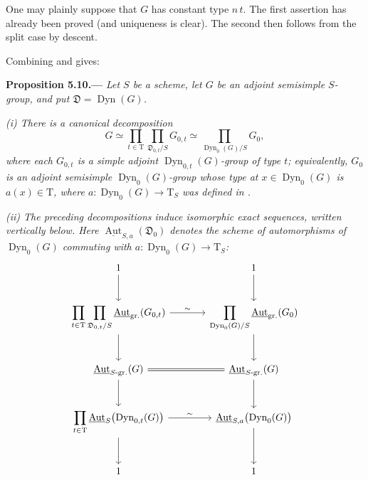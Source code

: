 One may plainly suppose that \(G\) has constant type \(n\,t\).  The
first assertion has already been proved (and uniqueness is clear).
The second then follows from the split case by descent.

Combining  and  gives:

\par\medskip\noindent{}\textbf{Proposition 5.10.---}\enspace
\emph{Let \(S\) be a scheme, let \(G\) be an adjoint semisimple
\(S\)-group, and put \(\mathfrak D=\operatorname{Dyn}(G)\).}

\emph{(i) There is a canonical decomposition}
\[
  G\simeq
  \prod_{t\in\mathrm T}
  \prod_{\mathfrak D_{0,t}/S}G_{0,t}
  \simeq
  \prod_{\operatorname{Dyn}_0(G)/S}G_0,
\]
\emph{where each \(G_{0,t}\) is a simple adjoint
\(\operatorname{Dyn}_{0,t}(G)\)-group of type \(t\); equivalently,
\(G_0\) is an adjoint semisimple
\(\operatorname{Dyn}_0(G)\)-group whose type at
\(x\in\operatorname{Dyn}_0(G)\) is \(a(x)\in\mathrm T\), where
\(a:\operatorname{Dyn}_0(G)\to\mathrm T_S\) was defined in .}

\emph{(ii) The preceding decompositions induce isomorphic exact
sequences, written vertically below.  Here
\(\underline{\operatorname{Aut}}_{S,a}(\mathfrak D_0)\) denotes the
scheme of automorphisms of \(\operatorname{Dyn}_0(G)\) commuting with
\(a:\operatorname{Dyn}_0(G)\to\mathrm T_S\):}
\[
\begin{tikzcd}[column sep=large,row sep=large]
1 \arrow[d] & 1 \arrow[d] \\
\displaystyle
\prod_{t\in\mathrm T}\prod_{\mathfrak D_{0,t}/S}
  \underline{\operatorname{Aut}}_{\mathrm{gr.}}(G_{0,t})
  \arrow[r,"\sim"] \arrow[d]
&
\displaystyle
\prod_{\operatorname{Dyn}_0(G)/S}
  \underline{\operatorname{Aut}}_{\mathrm{gr.}}(G_0)
  \arrow[d]
\\
\underline{\operatorname{Aut}}_{S\text{-}\mathrm{gr.}}(G)
  \arrow[r,equal] \arrow[d]
&
\underline{\operatorname{Aut}}_{S\text{-}\mathrm{gr.}}(G)
  \arrow[d]
\\
\displaystyle\prod_{t\in\mathrm T}
  \underline{\operatorname{Aut}}_S
    \bigl(\operatorname{Dyn}_{0,t}(G)\bigr)
  \arrow[r,"\sim"] \arrow[d]
&
\underline{\operatorname{Aut}}_{S,a}
  \bigl(\operatorname{Dyn}_0(G)\bigr)
  \arrow[d]
\\
1 & 1
\end{tikzcd}


\]

